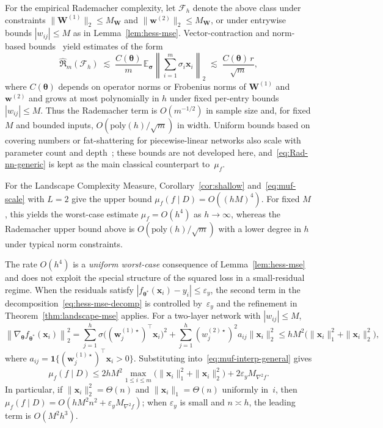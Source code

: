 \documentclass[10pt,letterpaper]{article}
\theoremstyle{definition}
\begin{document}
For the empirical Rademacher complexity, let $\mathcal{F}_h$ denote the above class under constraints
$\|\mathbf{W}^{(1)}\|_2\le M_{\mathbf{W}}$ and $\|\mathbf{w}^{(2)}\|_2\le M_{\mathbf{W}}$, or under entrywise bounds $|w_{ij}|\le M$ as in Lemma~\ref{lem:hess-mse}.
Vector-contraction and norm-based bounds~\cite{bartlett2002} yield estimates of the form
\begin{equation}\label{eq:Rad-nn-generic}
  \hat{\mathfrak{R}}_m(\mathcal{F}_h)
  \;\lesssim\;
  \frac{C(\boldsymbol{\theta})}{m}\,
  \mathbb{E}_{\boldsymbol{\sigma}}\left\|
    \sum_{i=1}^{m}\sigma_i \mathbf{x}_i
  \right\|_2
  \;\lesssim\;
  \frac{C(\boldsymbol{\theta})\, r}{\sqrt{m}},
\end{equation}
where $C(\boldsymbol{\theta})$ depends on operator norms or Frobenius norms of $\mathbf{W}^{(1)}$ and $\mathbf{w}^{(2)}$ and grows at most polynomially in $h$ under fixed per-entry bounds $|w_{ij}|\le M$.
Thus the Rademacher term is $O(m^{-1/2})$ in sample size and, for fixed $M$ and bounded inputs, $O(\mathrm{poly}(h)/\sqrt{m})$ in width.
Uniform bounds based on covering numbers or fat-shattering for piecewise-linear networks also scale with parameter count and depth~\cite{bartlett2002,harvey2019jmlr}; these bounds are not developed here, and~\eqref{eq:Rad-nn-generic} is kept as the main classical counterpart to~$\mu_f$.

For the Landscape Complexity Measure, Corollary~\ref{cor:shallow} and~\eqref{eq:muf-scale} with $L=2$ give the upper bound $\mu_f(f\mid D)=O((hM)^{4})$.
For fixed $M$, this yields the worst-case estimate $\mu_f=O(h^4)$ as $h\to\infty$, whereas the Rademacher upper bound above is $O(\mathrm{poly}(h)/\sqrt{m})$ with a lower degree in $h$ under typical norm constraints.

The rate $O(h^4)$ is a \emph{uniform worst-case} consequence of Lemma~\ref{lem:hess-mse} and does not exploit the special structure of the squared loss in a small-residual regime.
When the residuals satisfy $|f_{\boldsymbol{\theta}^*}(\mathbf{x}_i)-y_i|\le \varepsilon_y$, the second term in the decomposition~\eqref{eq:hess-mse-decomp} is controlled by~$\varepsilon_y$ and the refinement in Theorem~\ref{thm:landscape-mse} applies.
For a two-layer network with $|w_{ij}|\le M$,
\[
  \left\|\nabla_{\boldsymbol{\theta}}f_{\boldsymbol{\theta}^*}(\mathbf{x}_i)\right\|_2^2
  = \sum_{j=1}^{h}\sigma\!\bigl((\mathbf{w}^{(1)\star}_j)^{\top}\mathbf{x}_i\bigr)^2
    + \sum_{j=1}^{h}(w_j^{(2)\star})^2 a_{ij}\|\mathbf{x}_i\|_2^2
  \le hM^2\bigl(\|\mathbf{x}_i\|_1^2+\|\mathbf{x}_i\|_2^2\bigr),
\]
where $a_{ij}=\mathbf{1}\{(\mathbf{w}^{(1)\star}_j)^\top \mathbf{x}_i>0\}$.
Substituting into~\eqref{eq:muf-interp-general} gives
\[
  \mu_f(f\mid D)
  \le 2hM^2\max_{1\le i\le m}\bigl(\|\mathbf{x}_i\|_1^2+\|\mathbf{x}_i\|_2^2\bigr)
     + 2\varepsilon_y M_{\nabla^2 f}.
\]
In particular, if $\|\mathbf{x}_i\|_2^2=\Theta(n)$ and $\|\mathbf{x}_i\|_1=\Theta(n)$ uniformly in~$i$, then
$\mu_f(f\mid D)=O(hM^2n^2 + \varepsilon_y M_{\nabla^2 f})$; when $\varepsilon_y$ is small and $n\asymp h$, the leading term is $O(M^2h^3)$.
\end{document}
